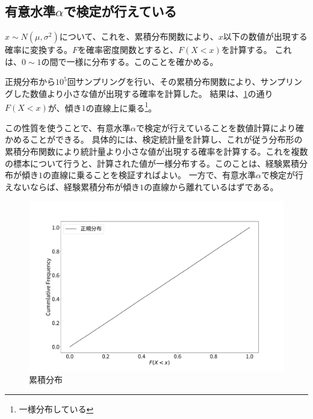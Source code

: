 

\subsection{有意水準$\alpha$で検定が行えている}
$x\sim N(\mu,\sigma^2)$について、これを、累積分布関数により、$x$以下の数値が出現する確率に変換する。$F$を確率密度関数とすると、$F(X<x)$を計算する。
これは、$0\sim 1$の間で一様に分布する。このことを確かめる。

正規分布から$10^5$回サンプリングを行い、その累積分布関数により、サンプリングした数値より小さな値が出現する確率を計算した。
結果は、\ref{fig:test_cummlative_distribution}の通り$F(X<x)$が、傾き$1$の直線上に乗る\footnote{一様分布している}。

この性質を使うことで、有意水準$\alpha$で検定が行えていることを数値計算により確かめることができる。
具体的には、検定統計量を計算し、これが従う分布形の累積分布関数により統計量より小さな値が出現する確率を計算する。これを複数の標本について行うと、計算された値が一様分布する。このことは、経験累積分布が傾き$1$の直線に乗ることを検証すればよい。
一方で、有意水準$\alpha$で検定が行えないならば、経験累積分布が傾き$1$の直線から離れているはずである。

\begin{figure}
  \begin{center}
    \includegraphics[width=15cm]{./image/04_/test_cummlative_distribution.pdf}
    \caption{累積分布}
   \label{fig:test_cummlative_distribution}
    \end{center}
\end{figure}



